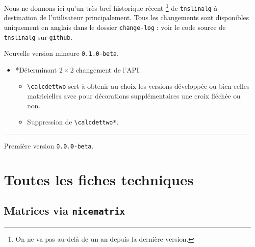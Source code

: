 \documentclass[12pt,a4paper]{article}
\makeatletter
\theoremstyle{definition}
\newcommand\topic{\@ifstar{\@topic@star}{\@topic@no@star}}
\newcommand\@topic@no@star[1]{%
    \textbf{\textsc{#1}.}%
}
\newcommand\@topic@star[1]{%
    \textbf{\textsc{#1} :}%
}
\newcommand\env[1]{\texttt{#1}}
\newcommand\macro[1]{\env{\textbackslash{}#1}}
\newcommand\separation{
    \medskip
    \hfill\rule{0.5\textwidth}{0.75pt}\hfill
    \medskip
}
\makeatother
\begin{document}
Nous ne donnons ici qu'un très bref historique récent
\footnote{
	On ne va pas au-delà de un an depuis la dernière version.
}
de \verb+tnslinalg+ à destination de l'utilisateur principalement.
Tous les changements sont disponibles uniquement en anglais dans le dossier \verb+change-log+ : voir le code source de \verb+tnslinalg+ sur \verb+github+.

\begin{description}

    \medskip
    \item[2020-08-27] Nouvelle version mineure \verb+0.1.0-beta+.
    
    \begin{itemize}[itemsep=.5em]
        \item \topic*{Déterminant $2 \times 2$} changement de l'API.
        \begin{itemize}[itemsep=.5em]
            \item \macro{calcdettwo} sert à obtenir au choix les versions développée ou bien celles matricielles avec pour décorations supplémentaires une croix fléchée ou non.
    
            \item Suppression de \macro{calcdettwo*}.
        \end{itemize}
    
    
    \end{itemize}
    
    \separation
    


    \medskip
    \item[2020-07-10] Première version \verb+0.0.0-beta+.

\end{description}


\newpage
\section{Toutes les fiches techniques} \label{techincal-ids}












\subsection{Matrices via \texttt{nicematrix}}
\end{document}
